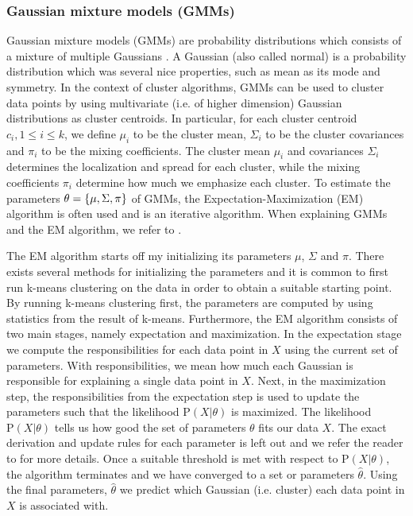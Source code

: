 \subsubsection{Gaussian mixture models (GMMs)}
\label{sec:gmm-clustering}
Gaussian mixture models (GMMs) are probability distributions which consists of a mixture of multiple Gaussians \cite[Section 9.2]{bishop2006}. A Gaussian (also called normal) is a probability distribution which was several nice properties, such as mean as its mode and symmetry. In the context of cluster algorithms, GMMs can be used to cluster data points by using multivariate (i.e. of higher dimension) Gaussian distributions as cluster centroids. In particular, for each cluster centroid $c_i, 1 \leq i \leq k$, we define $\mu_i$ to be the cluster mean, $\Sigma_i$ to be the cluster covariances and $\pi_i$ to be the mixing coefficients. The cluster mean $\mu_i$ and covariances $\Sigma_i$ determines the localization and spread for each cluster, while the mixing coefficients $\pi_i$ determine how much we emphasize each cluster. To estimate the parameters $\theta = \left\{\mu, \Sigma, \pi\right\}$ of GMMs, the Expectation-Maximization (EM) algorithm is often used and is an iterative algorithm. When explaining GMMs and the EM algorithm, we refer to \cite[Section 9.2]{bishop2006}.

The EM algorithm starts off my initializing its parameters $\mu$, $\Sigma$ and $\pi$. There exists several methods for initializing the parameters and it is common to first run k-means clustering on the data in order to obtain a suitable starting point. By running k-means clustering first, the parameters are computed by using statistics from the result of k-means. Furthermore, the EM algorithm consists of two main stages, namely expectation and maximization. In the expectation stage we compute the responsibilities for each data point in $X$ using the current set of parameters. With responsibilities, we mean how much each Gaussian is responsible for explaining a single data point in $X$. Next, in the maximization step, the responsibilities from the expectation step is used to update the parameters such that the likelihood $\text{P}(X | \theta)$ is maximized. The likelihood $\text{P}(X | \theta)$ tells us how good the set of parameters $\theta$ fits our data $X$. The exact derivation and update rules for each parameter is left out and we refer the reader to \cite[Section 9.4]{bishop2006} for more details. Once a suitable threshold is met with respect to $\text{P}(X | \theta)$, the algorithm terminates and we have converged to a set or parameters $\hat{\theta}$. Using the final parameters, $\hat{\theta}$ we predict which Gaussian (i.e. cluster) each data point in $X$ is associated with.

